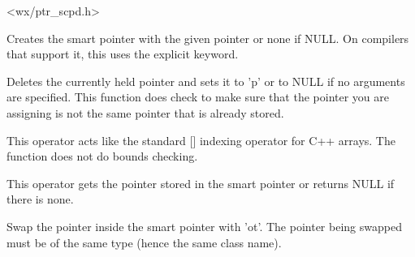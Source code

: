 
<wx/ptr\_scpd.h>


\rtfsp


\label{wxscopedarrayctor}


Creates the smart pointer with the given pointer or none if NULL.  On
compilers that support it, this uses the explicit keyword.

\label{wxscopedarrayreset}


Deletes the currently held pointer and sets it to 'p' or to NULL if no 
arguments are specified. This function does check to make sure that the
pointer you are assigning is not the same pointer that is already stored.

\label{wxscopedarraybracket}


This operator acts like the standard [] indexing operator for C++ arrays.  The
function does not do bounds checking.

\label{wxscopedarrayget}


This operator gets the pointer stored in the smart pointer or returns NULL if
there is none.

\label{wxscopedarrayswap}


Swap the pointer inside the smart pointer with 'ot'. The pointer being swapped
must be of the same type (hence the same class name).

